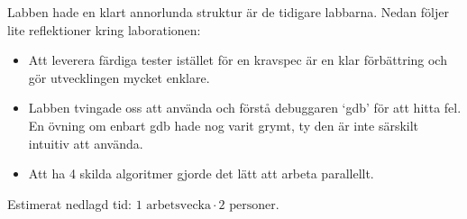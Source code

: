 \documentclass[a4paper,10pt,titlepage]{article}
\begin{document}
Labben hade en klart annorlunda struktur är de tidigare labbarna. Nedan följer lite reflektioner kring laborationen:

\begin{itemize}
	\item Att leverera färdiga tester istället för en kravspec är en klar förbättring och gör utvecklingen mycket enklare.
	\item Labben tvingade oss att använda och förstå debuggaren `gdb' för att hitta fel. En övning om enbart gdb hade nog varit grymt, ty den är inte särskilt intuitiv att använda.
	\item Att ha 4 skilda algoritmer gjorde det lätt att arbeta parallellt.
\end{itemize}

Estimerat nedlagd tid: $1 \text{ arbetsvecka} \cdot 2 \text{ personer}$.
\end{document}
